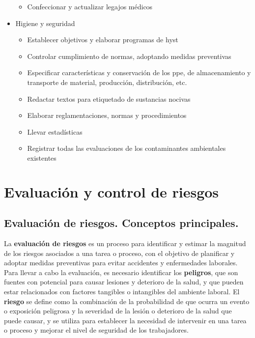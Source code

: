 \begin{itemize}
\begin{itemize}
		      \item Confeccionar y actualizar legajos médicos
	      \end{itemize}
	\item Higiene y seguridad
	      \begin{itemize}
		      \item Establecer objetivos y elaborar programas de \acrshort{hyst}
		      \item Controlar cumplimiento de normas, adoptando medidas
		            preventivas
		      \item Especificar características y conservación de los
		            \acrshort{ppe}, de almacenamiento y transporte de material,
		            producción, distribución, etc.
		      \item Redactar textos para etiquetado de sustancias nocivas
		      \item Elaborar reglamentaciones, normas y procedimientos
		      \item Llevar estadísticas
		      \item Registrar todas las evaluaciones de los contaminantes
		            ambientales existentes
	      \end{itemize}
\end{itemize}

\section{Evaluación y control de riesgos}

\subsection{Evaluación de riesgos. Conceptos principales.}

La \textbf{evaluación de riesgos} es un proceso para identificar y estimar la
magnitud de los riesgos asociados a una tarea o proceso, con el objetivo de
planificar y adoptar medidas preventivas para evitar accidentes y enfermedades
laborales. Para llevar a cabo la evaluación, es necesario identificar los
\textbf{\glspl{peligro}}, que son fuentes con potencial para causar lesiones y
deterioro de la salud, y que pueden estar relacionados con factores tangibles o
intangibles del ambiente laboral. El \textbf{\gls{riesgo}} se define como la
combinación de la \gls{probabilidad} de que ocurra un evento o exposición peligrosa y
la severidad de la lesión o deterioro de la salud que puede causar, y se
utiliza para establecer la necesidad de intervenir en una tarea o proceso y
mejorar el nivel de seguridad de los trabajadores.

